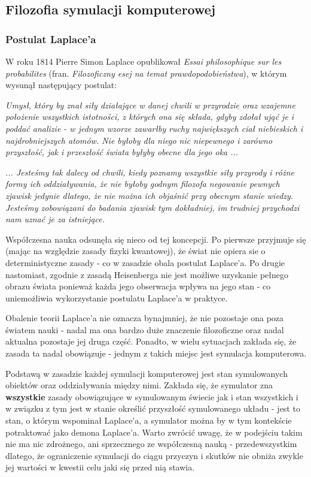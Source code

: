 \subsection{Filozofia symulacji komputerowej}

\subsubsection{Postulat Laplace'a}
\par{
W roku 1814 Pierre Simon Laplace opublikował \textit{Essai philosophique sur les probabilites} (fran. \textit{Filozoficzny esej na temat prawdopodobieństwa}), w którym wysunął następujący postulat:
}
\par{
\textit{Umysł, który by znał siły działające w danej chwili w przyrodzie oraz wzajemne położenie wszystkich istotności, z których ona się składa, gdyby zdołał ująć je i poddać analizie - w jednym wzorze zawarłby ruchy największych ciał niebieskich i najdrobniejszych atomów. Nie byłoby dla niego nic niepewnego i zarówno przyszłość, jak i przeszłość świata byłyby obecne dla jego oka ...
}}
\par{
\textit{... Jesteśmy tak dalecy od chwili, kiedy poznamy wszystkie siły przyrody i różne formy ich oddziaływania, że nie byłoby godnym filozofa negowanie pewnych zjawisk jedynie dlatego, że nie można ich objaśnić przy obecnym stanie wiedzy. Jesteśmy zobowiązani do badania zjawisk tym dokładniej, im trudniej przychodzi nam uznać je za istniejące.}
}

\par{
Współczesna nauka odsunęła się nieco od tej koncepcji. Po pierwsze przyjmuje się (mając na względzie zasady fizyki kwantowej), że świat nie opiera sie o deterministyczne zasady - co w zasadzie obala postulat Laplace'a. Po drugie nastomiast, zgodnie z zasadą Heisenberga nie jest możliwe uzyskanie pełnego obrazu świata ponieważ każda jego obserwacja wpływa na jego stan - co uniemożliwia wykorzystanie postulatu Laplace'a w praktyce.
}
\par{
Obalenie teorii Laplace'a nie oznacza bynajmniej, że nie pozostaje ona poza światem nauki - nadal ma ona bardzo duże znaczenie filozoficzne oraz nadal aktualna pozostaje jej druga część. Ponadto, w wielu sytuacjach zakłada się, że zasada ta nadal obowiązuje - jednym z takich miejsc jest symulacja komputerowa.
}
\par{
Podstawą w zasadzie każdej symulacji komputerowej jest stan symulowanych obiektów oraz oddziaływania między nimi. Zakłada się, że symulator zna \textbf{wszystkie} zasady obowiązujące w symulowanym świecie jak i stan wszystkich i w związku z tym jest w stanie określić przyszłość symulowanego układu - jest to stan, o którym wspominał Laplace'a, a symulator można by w tym kontekście potraktować jako demona Laplace'a. Warto zwrócić uwagę, że w podejściu takim nie ma nic zdrożnego, ani sprzecznego ze współczesną nauką - przedewszystkim dlatego, że ograniczenie symulacji do ciągu przyczyn i skutków nie obniża zwykle jej wartości w kwestii celu jaki się przed nią stawia.
}

